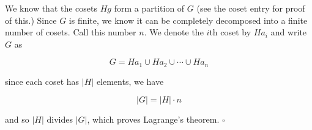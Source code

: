 \documentclass[12pt]{article}
\begin{document}
We know that the cosets $Hg$ form a partition of $G$ (see the coset entry for proof of this.)  Since $G$ is finite, we know it can be completely decomposed into a finite number of cosets.  Call this number $n$.  We denote the $i$th coset by $Ha_i$ and write $G$ as 

$$ G = Ha_1 \cup Ha_2 \cup \cdots \cup Ha_n $$

since each coset has $|H|$ elements, we have 

$$ |G| = |H|\cdot n $$

and so $|H|$ divides $|G|$, which proves Lagrange's theorem. $\square$
\end{document}

